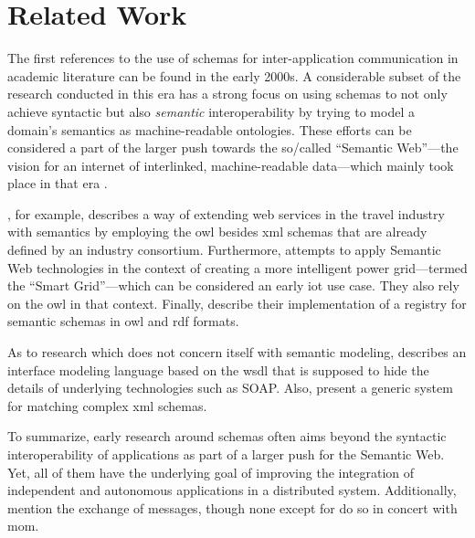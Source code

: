 
\section{Related Work}\label{sec:related-work}

The first references to the use of schemas for inter-application communication in academic literature can be found in the early 2000s.
A considerable subset of the research conducted in this era has a strong focus on using schemas to not only achieve syntactic but also \emph{semantic} interoperability by trying to model a domain's semantics as machine-readable ontologies.
These efforts can be considered a part of the larger push towards the so\-/called \enquote{Semantic Web}---the vision for an internet of interlinked, machine-readable data---which mainly took place in that era \parencite{noauthor_semantic_nodate}.

\cite{dogac_semantically_2004}, for example, describes a way of extending web services in the travel industry with semantics by employing the \gls{owl} besides \gls{xml} schemas that are already defined by an industry consortium.
Furthermore, \cite{crapo_semantically_2009} attempts to apply Semantic Web technologies in the context of creating a more intelligent power grid---termed the \enquote{Smart Grid}---which can be considered an early \gls{iot} use case. They also rely on the \gls{owl} in that context.
Finally, \cite{heery_metadata_2003} describe their implementation of a registry for semantic schemas in \gls{owl} and \gls{rdf} formats.

As to research which does not concern itself with semantic modeling, \cite{duftler_web_2001} describes an interface modeling language based on the \gls{wsdl} that is supposed to hide the details of underlying technologies such as SOAP.
Also, \cite{do_matching_2007} present a generic system for matching complex \gls{xml} schemas.

To summarize, early research around schemas often aims beyond the syntactic interoperability of applications as part of a larger push for the Semantic Web.
Yet, all of them have the underlying goal of improving the integration of independent and autonomous applications in a distributed system.
Additionally, \cites{duftler_web_2001}{dogac_semantically_2004}{li_semantic_2004}{crapo_semantically_2009} mention the exchange of messages, though none except for \cite{li_semantic_2004} do so in concert with \gls{mom}.

